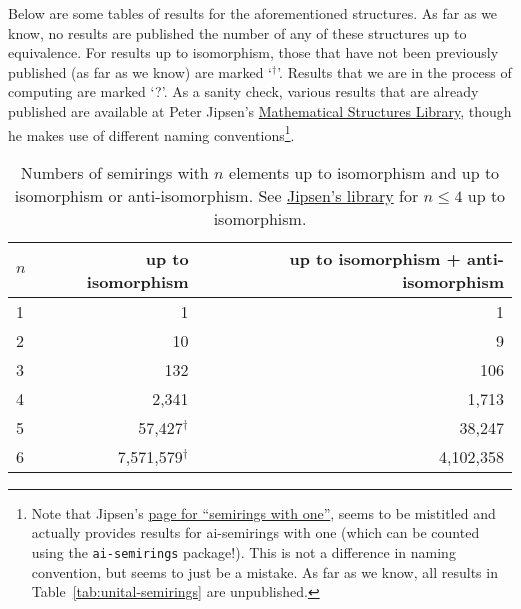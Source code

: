 \documentclass{article}
\theoremstyle{definition}
\begin{document}
Below are some tables of results for the aforementioned structures. As far as we know, no results are published the number of any of these structures up to equivalence. For results up to isomorphism, those that have not been previously published (as far as we know) are marked `$^\dagger$'. Results that we are in the process of computing are marked `?'. As a sanity check, various results that are already published are available at Peter Jipsen's \href{https://math.chapman.edu/~jipsen/structures/doku.php?id=start}{Mathematical Structures Library}, though he makes use of different naming conventions\footnote{Note that Jipsen's \href{https://math.chapman.edu/~jipsen/structures/doku.php?id=semirings_with_identity\#finite_members}{page for ``semirings with one''}, seems to be mistitled and actually provides results for ai-semirings with one (which can be counted using the \texttt{ai-semirings} package!). This is not a difference in naming convention, but seems to just be a mistake. As far as we know, all results in Table~\ref{tab:unital-semirings} are unpublished.}.
\begin{table}[ht]
    \centering
    \begin{tabular}{l|r|r}
      \toprule
      $n$ & up to isomorphism & up to isomorphism + anti-isomorphism \\
      \midrule
      1 & 1         & 1         \\
      2 & 10        & 9         \\
      3 & 132       & 106       \\
      4 & 2,341     & 1,713     \\
      5 & 57,427$^\dagger$    & 38,247    \\
      6 & 7,571,579$^\dagger$  & 4,102,358 \\
    \end{tabular}
    \caption{Numbers of semirings with $n$ elements up to isomorphism and up
    to isomorphism or anti-isomorphism. See \href{https://math.chapman.edu/~jipsen/structures/doku.php?id=semirings\#finite_members}{Jipsen's library} for \(n\leq4\) up to isomorphism.}
    \label{tab:semirings}
\end{table}
\end{document}
